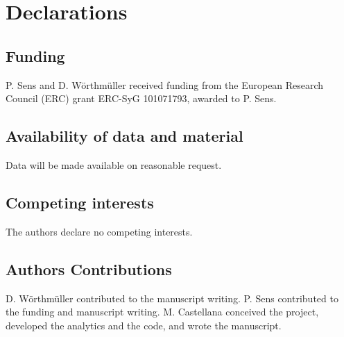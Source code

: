 \section*{Declarations}

\subsection*{Funding}

P. Sens and D. W\"orthm\"uller received funding from the European Research Council (ERC) grant ERC-SyG 101071793, awarded to P. Sens.

\subsection*{Availability of data and material}

Data will be made available on reasonable request.

\subsection*{Competing interests}

The authors declare no competing interests.

\subsection*{Authors Contributions}

D. W\"{o}rthm\"{u}ller contributed to the  manuscript writing. P. Sens contributed to the funding and manuscript writing. M. Castellana conceived the project, developed the  analytics and the code, and wrote the manuscript.